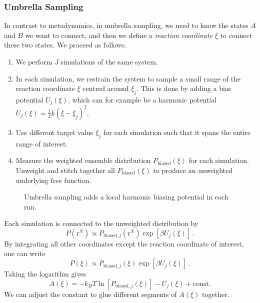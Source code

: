 \documentclass{article}
\theoremstyle{plain}\theoremheaderfont{\normalfont\itshape}\theorembodyfont{\rmfamily}\theoremseparator{.}\newtheorem*{rem}{Remark}\newtheorem*{ex}{Example}\newtheorem*{proof}{Proof}\newtheorem*{altp}{Alternative proof}
\theoremstyle{plain}\theoremheaderfont{\normalfont\bfseries}\theorembodyfont{\rmfamily}\theoremseparator{.}\newtheorem{thm}{Theorem}[section]\newtheorem{lem}[thm]{Lemma}\newtheorem{prop}[thm]{Proposition}\newtheorem*{cor}{Corollary}\newtheorem{defn}[thm]{Definition}\newtheorem{clm}[thm]{Claim}\newtheorem{clminproof}{Claim}\newtheorem{alg}[thm]{Algorithm}\newtheorem{hyp}[thm]{Hypothesis}\newtheorem{law}[thm]{Law}
\theoremstyle{break}\theoremheaderfont{\normalfont\itshape}\theorembodyfont{\rmfamily}\theoremseparator{.\medskip}\newtheorem*{proofskip}{Proof}\newtheorem*{exs}{Examples}\newtheorem*{rems}{Remarks}
\theoremstyle{break}\theoremheaderfont{\normalfont\bfseries}\theorembodyfont{\rmfamily}\theoremseparator{.\medskip}\newtheorem{lemskip}[thm]{Lemma}\newtheorem{defnskip}[thm]{Definition}\newtheorem{propskip}[thm]{Proposition}\newtheorem{thmskip}[thm]{Theorem}
\numberwithin{equation}{section}
\newcommand{\vb}[1]{\bm{\mathrm{#1}}}
\begin{document}
    \subsubsection*{Umbrella Sampling}
    In contrast to metadynamics, in umbrella sampling, we need to know the states \(A\) and \(B\) we want to connect, and then we define a \textit{reaction coordinate} \(\xi\) to connect these two states. We proceed as follows:
    \begin{enumerate}[topsep=0pt]
        \item We perform \(J\) simulations of the same system.
        \item In each simulation, we restrain the system to sample a small range of the reaction coordinate \(\xi\) centred around \(\xi_j\). This is done by adding a bias potential \(U_j(\xi)\), which can for example be a harmonic potential \(U_j(\xi)=\frac{1}{2}k(\xi-\xi_j)^2\).
        \item Use different target value \(\xi_j\) for each simulation such that it spans the entire range of interest.
        \item Measure the weighted ensemble distribution \(P_{\text{biased}}(\xi)\) for each simulation. Unweight and stitch together all \(P_{\text{biased}}(\xi)\) to produce an unweighted underlying free function.
    \end{enumerate}

    \begin{figure}
        \centering
        \caption{Umbrella sampling adds a local harmonic biasing potential in each run.}
    \end{figure}

    Each simulation is connected to the unweighted distribution by
    \begin{equation}
        P(\vb{r}^N)\propto P_{\text{biased}, j}(\vb{r}^N)\exp[\beta U_j(\xi)]\,.
    \end{equation}
    By integrating all other coordinates except the reaction coordinate of interest, one can write
    \begin{equation}
        P(\xi)\propto P_{\text{biased}, j}(\xi)\exp[\beta U_j(\xi)]\,.
    \end{equation}
    Taking the logarithm gives
    \begin{equation}
        A(\xi)=-k_B T\ln[P_{\text{biased}, j}(\xi)]-U_j(\xi)+\text{const.}
    \end{equation}
    We can adjust the constant to glue different segments of \(A(\xi)\) together.
\end{document}
